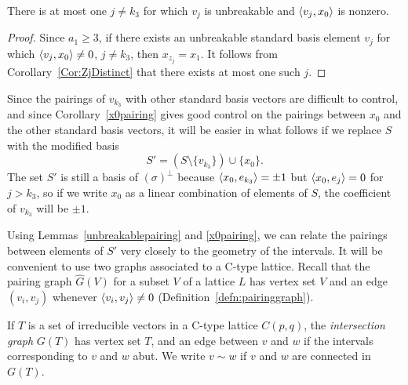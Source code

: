 \begin{cor}\label{x0pairing}
There is at most one $j \neq k_3$ for which $v_j$ is unbreakable and $\left\langle v_j , x_0 \right\rangle$ is nonzero. 
\end{cor}
\begin{proof}
Since $a_1 \ge 3$, if there exists an unbreakable standard basis element $v_j$ for which $\left\langle v_j , x_0 \right\rangle \neq 0$, $j \neq k_3$, then $x_{z_j} =x_1$. It follows from Corollary~\ref{Cor:ZjDistinct} that there exists at most one such $j$.
\end{proof}

Since the pairings of $v_{k_3}$ with other standard basis vectors are difficult to control, and since Corollary~\ref{x0pairing} gives good control on the pairings between $x_0$ and the other standard basis vectors, it will be easier in what follows if we replace $S$ with the modified basis 
\begin{equation}\label{Eq:S'}
S' = \left(S \setminus \{v_{k_3}\}\right) \cup \{x_0\}. 
\end{equation}
The set $S'$ is still a basis of $(\sigma)^\perp$ because $\left\langle x_0 , e_{k_3} \right\rangle = \pm 1$ but $\left\langle x_0 , e_j \right\rangle = 0$ for $j > k_3$, so if we write $x_0$ as a linear combination of elements of $S$, the coefficient of $v_{k_3}$ will be $\pm 1$.

Using Lemmas~\ref{unbreakablepairing} and \ref{x0pairing}, we can relate the pairings between elements of $S'$ very closely to the geometry of the intervals. It will be convenient to use two graphs associated to a C-type lattice. Recall that the pairing graph $\hat{G}(V)$ for a subset $V$ of a lattice $L$ has vertex set $V$ and an edge $(v_i,v_j)$ whenever $\left\langle v_i , v_j \right\rangle \neq 0$ (Definition~\ref{defn:pairinggraph}).

 
\begin{definition}
If $T$ is a set of irreducible vectors in a C-type lattice $C(p,q)$, the {\it intersection graph} $G(T)$ has vertex set $T$, and an edge between $v$ and $w$ if the intervals corresponding to $v$ and $w$ abut. We write $v\sim w$ if $v$ and $w$ are connected in $G(T)$.
\end{definition}

